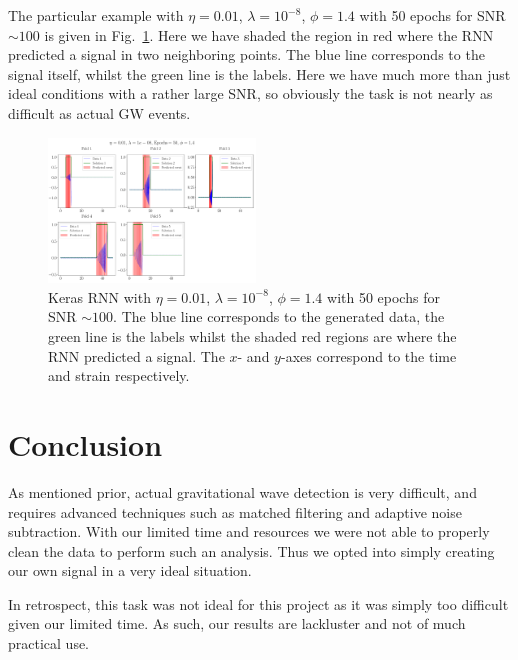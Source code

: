 \documentclass[%
reprint,
amsmath,amssymb,
aps,
]{revtex4-2}
\begin{document}
The particular example with $\eta=0.01$, $\lambda=10^{-8}$, $\phi=1.4$ with 50 epochs for SNR $\sim100$ is given in Fig.~\ref{fig:bestPred}. Here we have shaded the region in red where the RNN predicted a signal in two neighboring points. The blue line corresponds to the signal itself, whilst the green line is the labels. Here we have much more than just ideal conditions with a rather large SNR, so obviously the task is not nearly as difficult as actual GW events. 
\begin{figure}
	\includegraphics[width=0.49\textwidth]{Figures/BestPrediction_Epochs50_Phi1.4.pdf}
	\caption{Keras RNN with $\eta=0.01$, $\lambda=10^{-8}$, $\phi=1.4$ with 50 epochs for SNR $\sim100$. The blue line corresponds to the generated data, the green line is the labels whilst the shaded red regions are where the RNN predicted a signal. The $x$- and $y$-axes correspond to the time and strain respectively.}
	\label{fig:bestPred}
\end{figure}


\section{Conclusion}
As mentioned prior, actual gravitational wave detection is very difficult, and requires advanced techniques such as matched filtering and adaptive noise subtraction. With our limited time and resources we were not able to properly clean the data to perform such an analysis. Thus we opted into simply creating our own signal in a very ideal situation. 

In retrospect, this task was not ideal for this project as it was simply too difficult given our limited time. As such, our results are lackluster and not of much practical use.



	
\end{document}
